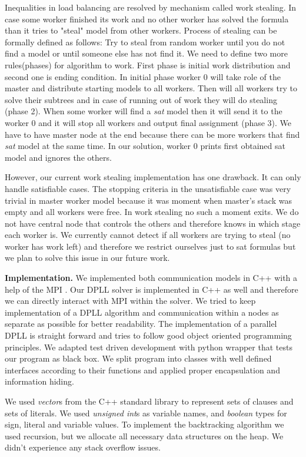 \documentclass[letterpaper]{article}
\newcommand{\mypar}[1]{{\bf #1.}}
\begin{document}
Inequalities in load balancing are resolved by mechanism called work stealing. In case some worker finished its work and no other worker has solved the formula than it tries to "steal" model from other workers. Process of stealing can be formally defined as follows: Try to steal from random worker until you do not find a model or until someone else has not find it. We need to define two more rules(phases) for algorithm to work. First phase is initial work distribution and second one is ending condition. In initial phase worker 0 will take role of the master and distribute starting models to all workers. Then will all workers try to solve their subtrees and in case of running out of work they will do stealing (phase 2). When some worker will find a \textit{sat} model then it will send it to the worker 0 and it will stop all workers and output final assignment (phase 3). We have to have master node at the end because there can be more workers that find \textit{sat} model at the same time. In our solution, worker 0 prints first obtained sat model and ignores the others.

However, our current work stealing implementation has one drawback. It can only handle satisfiable cases. The stopping criteria in the unsatisfiable case was very trivial in master worker model because it was moment when master's stack was empty and all workers were free. In work stealing no such a moment exits. We do not have central node that controls the others and therefore knows in which stage each worker is. We currently cannot detect if all workers are trying to steal (no worker has work left) and therefore we restrict ourselves just to sat formulas but we plan to solve this issue in our future work. 

\mypar{Implementation}
We implemented both communication models in C++ with a help of the MPI \cite{mpi}.
Our DPLL solver is implemented in C++ as well and therefore we can directly interact with MPI within the solver. We tried to keep implementation of a DPLL algorithm and communication within a nodes as separate as possible for better readability.
The implementation of a parallel DPLL is straight forward and tries to follow good object oriented programming principles. We adapted test driven development with python wrapper that tests our program as black box. We split program into classes with well defined interfaces according to their functions and applied proper encapsulation and information hiding. 

We used \textit{vector}s from the C++ standard library to represent sets of clauses and sets of literals. We used \textit{unsigned int}s as variable names, and \textit{boolean} types for sign, literal and variable values. 
To implement the backtracking algorithm we used recursion, but we allocate all necessary data structures on the heap.
We didn't experience any stack overflow issues.
\end{document}
